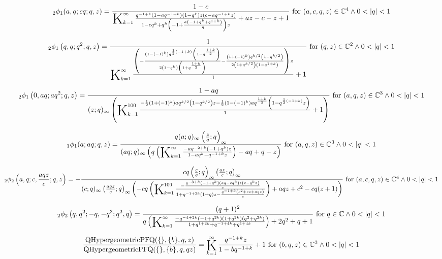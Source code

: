 \documentclass{article}
\newcommand{\bigK}{\mathop{\raisebox{-5pt}{\huge K}}}
\begin{document}
\[\, _2\phi _1(a,q;c q;q,z)=\frac{1-c}{\bigK_{k=1}^{\infty}\frac{q^{-1+k} \left(1-a q^{-1+k}\right) \left(1-q^k\right) z \left(c-a q^{-1+k} z\right)}{1-c q^k+q^k \left(-1+\frac{a \left(-1+q^k+q^{1+k}\right)}{q}\right) z}+a z-c-z+1}\text{ for }(a,c,q,z)\in \mathbb{C}^4\land 0<\left| q\right| <1\] 

\[\, _2\phi _1\left(q,q;q^2;q,z\right)=\frac{1}{\bigK_{k=1}^{\infty}\frac{\left(-\frac{\left(1-(-1)^k\right) q^{\frac{1}{2} (-1+k)} \left(1-q^{\frac{1+k}{2}}\right)}{2 \left(1-q^k\right) \left(1+q^{\frac{1+k}{2}}\right)}-\frac{\left(1+(-1)^k\right) q^{k/2} \left(1-q^{k/2}\right)}{2 \left(1+q^{k/2}\right) \left(1-q^{1+k}\right)}\right) z}{1}+1}\text{ for }(q,z)\in \mathbb{C}^2\land 0<\left| q\right| <1\] 

\[\, _2\phi _1\left(0,a q;a q^2;q,z\right)=\frac{1-a q}{(z;q)_{\infty } \left(\bigK_{k=1}^{100}\frac{-\frac{1}{2} \left(1+(-1)^k\right) a q^{k/2} \left(1-q^{k/2}\right) z-\frac{1}{2} \left(1-(-1)^k\right) a q^{\frac{1+k}{2}} \left(1-q^{\frac{1}{2} (-1+k)} z\right)}{1}+1\right)}\text{ for }(a,q,z)\in \mathbb{C}^3\land 0<\left| q\right| <1\] 

\[\, _1\phi _1(a;a q;q,z)=\frac{q (a;q)_{\infty } \left(\frac{z}{q};q\right)_{\infty }}{(a q;q)_{\infty } \left(q \left(\bigK_{k=1}^{\infty}\frac{-a q^{-2+k} \left(-1+q^k\right) z}{1-a q^k-q^{-1+k} z}\right)-a q+q-z\right)}\text{ for }(a,q,z)\in \mathbb{C}^3\land 0<\left| q\right| <1\] 

\[\, _2\phi _2\left(a,q;c,\frac{a q z}{c};q,z\right)=-\frac{c q \left(\frac{c}{q};q\right)_{\infty } \left(\frac{a z}{c};q\right)_{\infty }}{(c;q)_{\infty } \left(\frac{a q z}{c};q\right)_{\infty } \left(-c q \left(\bigK_{k=1}^{100}\frac{-\frac{q^{-3+k} \left(-1+q^k\right) \left(a q-c q^k\right) z \left(c-q^k z\right)}{c}}{1+q^{-1+2 k} (1+q) z-\frac{q^{-1+k} \left(c^2+c z+a q z\right)}{c}}\right)+a q z+c^2-c q (z+1)\right)}\text{ for }(a,c,q,z)\in \mathbb{C}^4\land 0<\left| q\right| <1\] 

\[\, _2\phi _2\left(q,q^2;-q,-q^3;q^2,q\right)=\frac{(q+1)^2}{q \left(\bigK_{k=1}^{\infty}\frac{-q^{-4+2 k} \left(-1+q^{2 k}\right) \left(1+q^{2 k}\right) \left(q^2+q^{2 k}\right)}{1+q^{1+2 k}+q^{-1+4 k}+q^{1+4 k}}\right)+2 q^2+q+1}\text{ for }q\in \mathbb{C}\land 0<\left| q\right| <1\] 

\[\frac{\text{QHypergeometricPFQ}(\{\},\{b\},q,z)}{\text{QHypergeometricPFQ}(\{\},\{b\},q,q z)}=\bigK_{k=1}^{\infty}\frac{q^{-1+k} z}{1-b q^{-1+k}}+1\text{ for }(b,q,z)\in \mathbb{C}^3\land 0<\left| q\right| <1\] 
\end{document}
